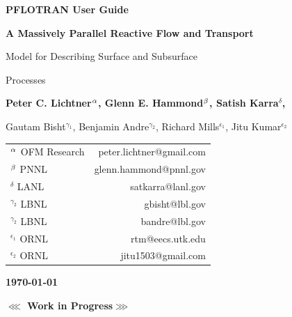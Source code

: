 \begin{center}

\dblline

\vspace{1 cm}

{\bf\huge PFLOTRAN User Guide}

\vspace{1cm}

{\bf\LARGE A Massively Parallel Reactive Flow and Transport 

Model for Describing Surface and Subsurface 

Processes}

\vspace{1cm}

{\bf\large Peter C. Lichtner${^{\alpha}_{~}}$, Glenn E. Hammond${^{\beta}_{~}}$, Satish Karra${^\delta_{~}}$, 

Gautam Bisht$^{\gamma_1}$, Benjamin Andre$^{\gamma_2}$, Richard Mills$^{\epsilon_1}$, Jitu Kumar$^{\epsilon_2}$}

\vspace{1cm}

\begin{tabular}{lr}
$^{{\alpha}_{}}$ OFM Research & peter.lichtner@gmail.com\\
$^{\beta}$ PNNL & glenn.hammond@pnnl.gov\\
$^\delta$ LANL & satkarra@lanl.gov\\
$^{\gamma_2}$ LBNL & gbisht@lbl.gov\\
$^{\gamma_2}$ LBNL & bandre@lbl.gov\\
$^{\epsilon_1}$ ORNL & rtm@eecs.utk.edu \\
$^{\epsilon_2}$ ORNL & jitu1503@gmail.com
\end{tabular}

\vspace{0.5cm}

{\bf\large\today}


\vspace{0.5cm}

{\bf\LARGE $\lll$ Work in Progress$\ggg$}

\end{center}

